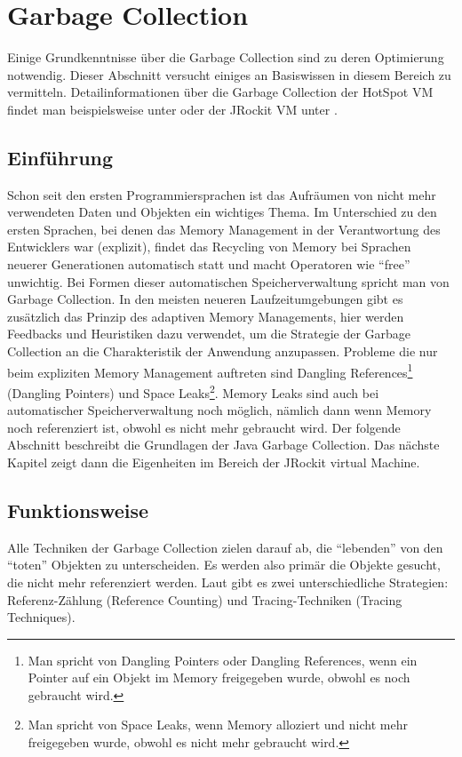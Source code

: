 \chapter{Garbage Collection}\label{grundlagen_gc}
Einige Grundkenntnisse über die Garbage Collection sind zu deren Optimierung notwendig. Dieser Abschnitt versucht einiges an Basiswissen in diesem Bereich zu vermitteln. Detailinformationen über die Garbage Collection der HotSpot VM findet man beispielsweise unter \cite{langerkreftJavaCore} oder der JRockit VM unter \cite{lagergren2010oracle}.

\section{Einführung}
Schon seit den ersten Programmiersprachen ist das Aufräumen von nicht mehr verwendeten Daten und Objekten ein wichtiges Thema. Im Unterschied zu den ersten Sprachen, bei denen das Memory Management in der Verantwortung des Entwicklers war (explizit), findet das Recycling von Memory bei Sprachen neuerer Generationen automatisch statt und macht Operatoren wie ``free'' unwichtig. Bei Formen dieser automatischen Speicherverwaltung spricht man von Garbage Collection. In den meisten neueren Laufzeitumgebungen gibt es zusätzlich das Prinzip  des adaptiven Memory Managements, hier werden Feedbacks und Heuristiken dazu verwendet, um die Strategie der Garbage Collection an die Charakteristik der Anwendung anzupassen. Probleme die nur beim expliziten Memory Management auftreten sind  Dangling References\footnote{Man spricht von Dangling Pointers oder Dangling References, wenn ein Pointer auf ein Objekt im Memory freigegeben wurde, obwohl es noch gebraucht wird.} (Dangling Pointers) und Space Leaks\footnote{Man spricht von Space Leaks, wenn Memory alloziert und nicht mehr freigegeben wurde, obwohl es nicht mehr gebraucht wird\cite{sunMemoryManagementWP}.}. Memory Leaks sind auch bei automatischer Speicherverwaltung noch möglich, nämlich dann wenn Memory noch referenziert ist, obwohl es nicht mehr gebraucht wird.
Der folgende Abschnitt beschreibt die Grundlagen der Java Garbage Collection. Das nächste Kapitel zeigt dann die Eigenheiten im Bereich der JRockit virtual Machine.

\section{Funktionsweise}
Alle Techniken der Garbage Collection zielen darauf ab, die ``lebenden'' von den ``toten'' Objekten zu unterscheiden. Es werden also primär die Objekte gesucht, die nicht mehr referenziert werden. Laut \cite[S. 77]{lagergren2010oracle} gibt es zwei unterschiedliche Strategien: Referenz-Zählung (Reference Counting) und Tracing-Techniken (Tracing Techniques).

